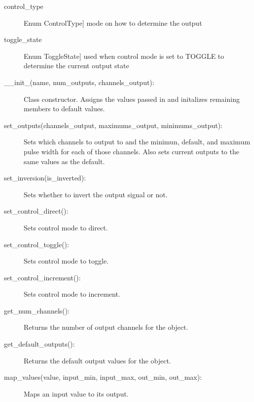 \documentclass[letterpaper,10pt,english]{sphinxmanual}
\begin{document}
\begin{fulllineitems}
\begin{description}
\item[{control\_type}] \leavevmode{[}Enum ControlType{]}
\sphinxAtStartPar
mode on how to determine the output

\item[{toggle\_state}] \leavevmode{[}Enum ToggleState{]}
\sphinxAtStartPar
used when control mode is set to TOGGLE to determine the current output state

\end{description}
\begin{description}
\item[{\_\_init\_(name, num\_outputs, channels\_output):}] \leavevmode
\sphinxAtStartPar
Class constructor. Assigns the values passed in and initalizes remaining members to default values.

\item[{set\_outputs(channels\_output, maximums\_output, minimums\_output):}] \leavevmode
\sphinxAtStartPar
Sets which channels to output to and the minimun, default, and maximum pulse width for each of those channels.
Also sets current outputs to the same values as the default.

\item[{set\_inversion(is\_inverted):}] \leavevmode
\sphinxAtStartPar
Sets whether to invert the output signal or not.

\item[{set\_control\_direct():}] \leavevmode
\sphinxAtStartPar
Sets control mode to direct.

\item[{set\_control\_toggle():}] \leavevmode
\sphinxAtStartPar
Sets control mode to toggle.

\item[{set\_control\_increment():}] \leavevmode
\sphinxAtStartPar
Sets control mode to increment.

\item[{get\_num\_channels():}] \leavevmode
\sphinxAtStartPar
Returns the number of output channels for the object.

\item[{get\_default\_outputs():}] \leavevmode
\sphinxAtStartPar
Returns the default output values for the object.

\item[{map\_values(value, input\_min, input\_max, out\_min, out\_max):}] \leavevmode
\sphinxAtStartPar
Maps an input value to its output.

\end{description}


\end{fulllineitems}
\end{document}
